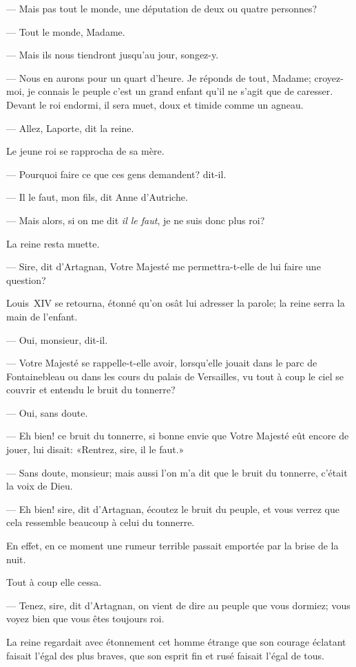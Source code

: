 — Mais pas tout le monde, une députation de deux ou quatre personnes?

— Tout le monde, Madame.

— Mais ils nous tiendront jusqu'au jour, songez-y.

— Nous en aurons pour un quart d'heure. Je réponds de tout, Madame; croyez-moi, je connais le peuple c'est un grand enfant qu'il ne s'agit que de caresser. Devant le roi endormi, il sera muet, doux et timide comme un agneau.

— Allez, Laporte, dit la reine.

Le jeune roi se rapprocha de sa mère.

— Pourquoi faire ce que ces gens demandent? dit-il.

— Il le faut, mon fils, dit Anne d'Autriche.

— Mais alors, si on me dit \textit{il le faut}, je ne suis donc plus roi?

La reine resta muette.

— Sire, dit d'Artagnan, Votre Majesté me permettra-t-elle de lui faire une question?

Louis~XIV se retourna, étonné qu'on osât lui adresser la parole; la reine serra la main de l'enfant.

— Oui, monsieur, dit-il.

— Votre Majesté se rappelle-t-elle avoir, lorsqu'elle jouait dans le parc de Fontainebleau ou dans les cours du palais de Versailles, vu tout à coup le ciel se couvrir et entendu le bruit du tonnerre?

— Oui, sans doute.

— Eh bien! ce bruit du tonnerre, si bonne envie que Votre Majesté eût encore de jouer, lui disait: «Rentrez, sire, il le faut.»

— Sans doute, monsieur; mais aussi l'on m'a dit que le bruit du tonnerre, c'était la voix de Dieu.

— Eh bien! sire, dit d'Artagnan, écoutez le bruit du peuple, et vous verrez que cela ressemble beaucoup à celui du tonnerre.

En effet, en ce moment une rumeur terrible passait emportée par la brise de la nuit.

Tout à coup elle cessa.

— Tenez, sire, dit d'Artagnan, on vient de dire au peuple que vous dormiez; vous voyez bien que vous êtes toujours roi.

La reine regardait avec étonnement cet homme étrange que son courage éclatant faisait l'égal des plus braves, que son esprit fin et rusé faisait l'égal de tous.

